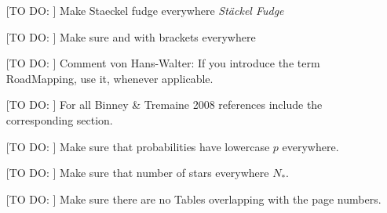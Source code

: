 \begin{itemize}
\item[[TO DO:]] Make Staeckel fudge everywhere \emph{St\"{a}ckel Fudge}
\item[[TO DO:]] Make sure \MAP{} and \MAPs{} with brackets everywhere
\item[[TO DO:]] Comment von Hans-Walter: If you introduce the term RoadMapping, use it, whenever applicable.
\item[[TO DO:]] For all Binney \& Tremaine 2008 references include the corresponding section.
\item[[TO DO:]] Make sure that probabilities have lowercase $p$ everywhere.
\item[[TO DO:]] Make sure that number of stars everywhere $N_*$.
\item[[TO DO:]] Make sure there are no Tables overlapping with the page numbers.
\end{itemize}



